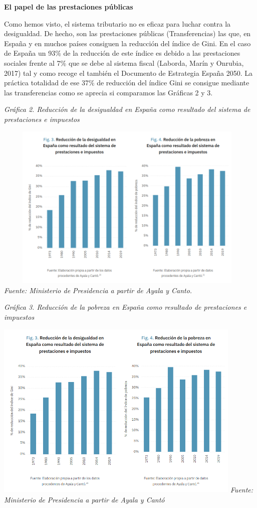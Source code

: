 \documentclass[
]{article}
\begin{document}
\textbf{El papel de las prestaciones públicas}

Como hemos visto, el sistema tributario no es eficaz para luchar contra
la desigualdad. De hecho, son las prestaciones públicas (Transferencias)
las que, en España y en muchos países consiguen la reducción del índice
de Gini. En el caso de España un 93\% de la reducción de este índice es
debido a las prestaciones sociales frente al 7\% que se debe al sistema
fiscal (Laborda, Marín y Onrubia, 2017) tal y como recoge el también el
Documento de Estrategia España 2050. La práctica totalidad de ese 37\%
de reducción del índice Gini se consigue mediante las transferencias
como se aprecia si comparamos las Gráficas 2 y 3.

\emph{Gráfica 2. Reducción de la desigualdad en España como resultado
del sistema de prestaciones e impuestos}

\includegraphics[width=5.1125in,height=3.15069in]{png/image2.png}
\emph{Fuente: Ministerio de Presidencia a partir de Ayala y Canto.}

\emph{Gráfica 3. Reducción de la pobreza en España como resultado de
prestaciones e impuestos}

\includegraphics[width=4.65764in,height=3.39167in]{png/image2.png}
\emph{Fuente: Ministerio de Presidencia a partir de Ayala y Cantó}
\end{document}
